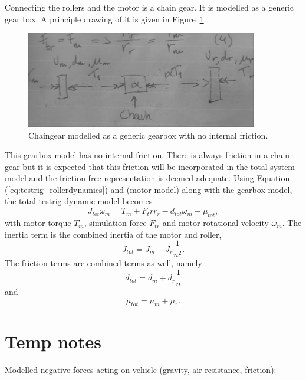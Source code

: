 Connecting the rollers and the motor is a chain gear. It is modelled as a
generic gear box. A principle drawing of it is given in
Figure~\ref{fig:testrig_chaingear}. 
\begin{figure}[H]
    \label{fig:testrig_chaingear}
    \centering
    \includegraphics[width=0.9\textwidth]{./img/testrig_chaingear.png}
    \caption{Chaingear modelled as a generic gearbox with no internal friction.}
\end{figure}
This gearbox model has no internal friction.  There is always friction in a
chain gear but it is expected that this friction will be incorporated in the
total system model and the friction free representation is deemed adequate.
Using Equation (\ref{eq:testrig_rollerdynamics}) and (motor model) along with
the gearbox model, the total testrig dynamic model becomes
\begin{equation} \label{eq:testrig_totaldynamics}
    J_{tot} \dot{\omega_m} = T_m + F_tr r_r - d_{tot} \omega_m - \mu_{tot},
\end{equation}
with motor torque $T_m$, simulation force $F_{tr}$ and motor rotational velocity
$\omega_m$. The inertia term is the combined inertia of the motor and
roller,
\begin{equation} \label{eq:totalinertia}
    J_{tot} = J_m + J_r \frac{1} {n^2}.
\end{equation}
The friction terms are combined terms as well, namely
\begin{equation} \label{eq:testrig_totalvfric}
    d_{tot} = d_m + d_r \frac {1} {n}
\end{equation}
and
\begin{equation} \label{eq:testrig_totalfric}
    \mu_{tot} = \mu_m + \mu_r.
\end{equation}



\section{Temp notes}
Modelled negative forces acting on vehicle (gravity, air resistance, friction): 


